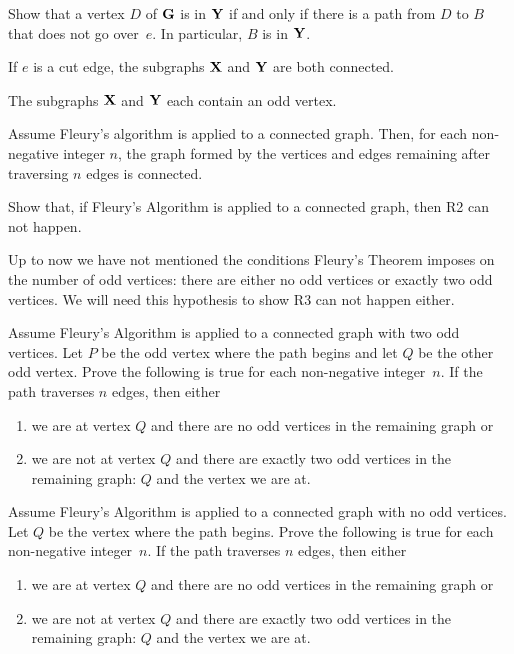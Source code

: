 \begin{prb}\label{Y}
Show that a vertex $D$ of\/ $\mathbf G$ is in $\mathbf Y$ if and only if there is a path from $D$ to $B$ that does not go over~$e$.  In particular,  $B$ is in $\mathbf Y$.
\end{prb}

\begin{prb}\label{connected}
If $e$ is a cut edge, the subgraphs $\mathbf X$ and $\mathbf Y$ are both connected.
\end{prb}

\begin{prb}\label{odd vertex}
The subgraphs $\mathbf X$ and $\mathbf Y$ each contain an odd vertex.
\end{prb}

\begin{prb}\label{connectedgrph}
Assume Fleury's algorithm is applied to a connected graph.  Then, for each non-negative integer $n$,  the graph formed by the vertices and edges remaining after traversing $n$ edges is connected.
\end{prb}

\begin{prb}\label{not R2}
Show that, if Fleury's Algorithm is applied to a connected graph, then {\rm R2} can not happen.
\end{prb}
\goodbreak

Up to now we have not mentioned the conditions Fleury's Theorem imposes on the number of odd vertices:  there are either no odd vertices or exactly two odd vertices.  We will need this hypothesis to show R3 can not happen either.

\begin{prb}
Assume Fleury's Algorithm is applied to a connected graph with two odd vertices.  Let $P$ be the odd vertex where the path begins and let $Q$ be the other odd vertex.  Prove the following is true  for each non-negative integer~$n$.  If the path traverses $n$ edges, then either
\begin{enumerate}
   \item we are at vertex $Q$ and there are no odd vertices in the remaining graph or
   \item we are not at vertex $Q$ and there are exactly two odd vertices in the remaining graph:  $Q$ and the vertex we are at.
\end{enumerate}
\end{prb}

\begin{prb}
Assume Fleury's Algorithm is applied to a connected graph with no odd vertices.  Let $Q$ be the vertex where the path begins.  Prove the following is true  for each non-negative integer~$n$.  If the path traverses $n$ edges, then either
\begin{enumerate}
   \item we are at vertex $Q$ and there are no odd vertices in the remaining graph or
   \item we are not at vertex $Q$ and there are exactly two odd vertices in the remaining graph:  $Q$ and the vertex we are at.
\end{enumerate}
\end{prb}

